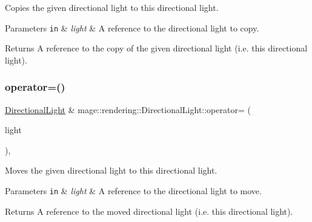 Copies the given directional light to this directional light.


\begin{DoxyParams}[1]{Parameters}
\mbox{\tt in}  & {\em light} & A reference to the directional light to copy. \\
\hline
\end{DoxyParams}
\begin{DoxyReturn}{Returns}
A reference to the copy of the given directional light (i.\+e. this directional light). 
\end{DoxyReturn}
\hypertarget{classmage_1_1rendering_1_1_directional_light_abcb7fb355a9d3004fd2f9b597b6166d2}{}\label{classmage_1_1rendering_1_1_directional_light_abcb7fb355a9d3004fd2f9b597b6166d2} 
\subsubsection{\texorpdfstring{operator=()}{operator=()}\hspace{0.1cm}{\footnotesize\ttfamily [2/2]}}
{\footnotesize\ttfamily \hyperlink{classmage_1_1rendering_1_1_directional_light}{Directional\+Light} \& mage\+::rendering\+::\+Directional\+Light\+::operator= (\begin{DoxyParamCaption}\item[{\hyperlink{classmage_1_1rendering_1_1_directional_light}{Directional\+Light} \&\&}]{light }\end{DoxyParamCaption})\hspace{0.3cm}{\ttfamily [default]}, {\ttfamily [noexcept]}}

Moves the given directional light to this directional light.


\begin{DoxyParams}[1]{Parameters}
\mbox{\tt in}  & {\em light} & A reference to the directional light to move. \\
\hline
\end{DoxyParams}
\begin{DoxyReturn}{Returns}
A reference to the moved directional light (i.\+e. this directional light). 
\end{DoxyReturn}
\hypertarget{classmage_1_1rendering_1_1_directional_light_af8570b18bfb807492317e4a98f5c7ba6}{}\label{classmage_1_1rendering_1_1_directional_light_af8570b18bfb807492317e4a98f5c7ba6} 
